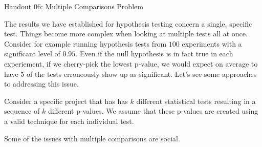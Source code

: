 \documentclass{tufte-handout}
\begin{document}
\justify

{\LARGE Handout 06: Multiple Comparisons Problem}

\vspace*{18pt}

\noindent
The results we have established for hypothesis testing concern a
single, specific test. Things become more complex when looking at
multiple tests all at once. Consider for example running hypothesis
tests from $100$ experiments with a significant level of $0.95$. Even
if the null hypothesis is in fact true in each experiement, if we
cherry-pick the lowest p-value, we would expect on average to have
$5$ of the tests erroneously show up as significant. Let's see some
approaches to addressing this issue.

Consider a specific project that has has $k$ different statistical
tests resulting in a sequence of $k$ different p-values. We assume
that these p-values are created using a valid technique for each 
individual test. 


Some of the issues with multiple comparisons are social. 
\end{document}
